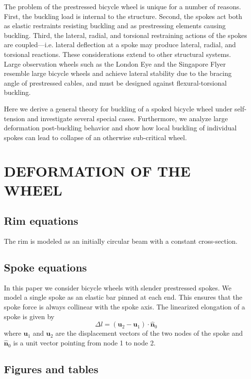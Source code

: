 \documentclass{bmd2016p}
\begin{document}
The problem of the prestressed bicycle wheel is unique for a number of reasons. First, the buckling load is internal to the structure. Second, the spokes act both as elastic restraints resisting buckling and as prestressing elements causing buckling. Third, the lateral, radial, and torsional restraining actions of the spokes are coupled---i.e. lateral deflection at a spoke may produce lateral, radial, and torsional reactions. These considerations extend to other structural systems. Large observation wheels such as the London Eye\cite{Mann2001a} and the Singapore Flyer\cite{Allsop2009a} resemble large bicycle wheels and achieve lateral stability due to the bracing angle of prestressed cables, and must be designed against flexural-torsional buckling.

Here we derive a general theory for buckling of a spoked bicycle wheel under self-tension and investigate several special cases. Furthermore, we analyze large deformation post-buckling behavior and show how local buckling of individual spokes can lead to collapse of an otherwise sub-critical wheel.

\section{DEFORMATION OF THE WHEEL}
\subsection{Rim equations}

The rim is modeled as an initially circular beam with a constant cross-section.

\subsection{Spoke equations}

In this paper we consider bicycle wheels with slender prestressed spokes. We model a single spoke as an elastic bar pinned at each end. This ensures that the spoke force is always collinear with the spoke axis. The linearized elongation of a spoke is given by
\begin{equation}\label{eq:elong}
\Delta l = (\bm{u}_2 - \bm{u}_1)\cdot \hat{\bm{n}}_0
\end{equation}
where $\bm{u}_1$ and $\bm{u}_2$ are the displacement vectors of the two nodes of the spoke and $\hat{\bm{n}}_0$ is a unit vector pointing from node 1 to node 2.

\subsection{Figures and tables}
\end{document}
